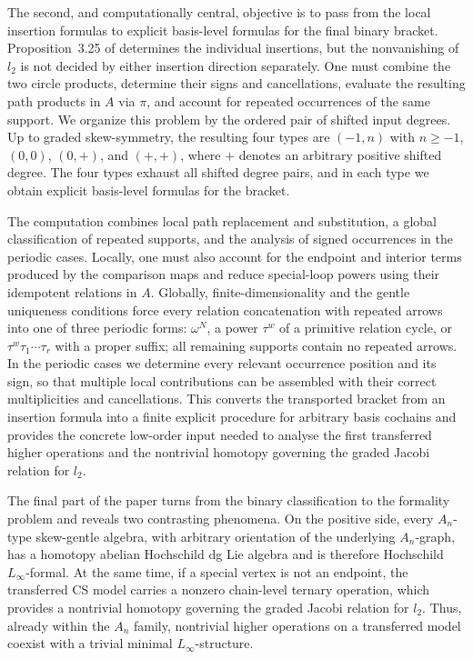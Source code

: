\documentclass[11pt,a4paper,reqno]{amsart}
\theoremstyle{plain}
\theoremstyle{definition}
\numberwithin{equation}{section}
\begin{document}
	The second, and computationally central, objective is to pass from the local
	insertion formulas to explicit basis-level formulas for the final binary
	bracket.  Proposition~3.25 of \cite{BSSWW26} determines the individual
	insertions, but the nonvanishing of $l_2$ is not decided by either insertion
	direction separately.  One must combine the two circle products, determine
	their signs and cancellations, evaluate the resulting path products in $A$
	via $\pi$, and account for repeated occurrences of the same support.  We
	organize this problem by the ordered pair of shifted input degrees.  Up to
	graded skew-symmetry, the resulting four types are $(-1,n)$ with $n\geq-1$,
	$(0,0)$, $(0,+)$, and $(+,+)$, where $+$ denotes an arbitrary positive
	shifted degree.  The four types exhaust all shifted degree pairs, and in each
	type we obtain explicit basis-level formulas for the bracket.
	
	The computation combines local path replacement and substitution, a global
	classification of repeated supports, and the analysis of signed occurrences
	in the periodic cases.  Locally, one must also account for the endpoint and
	interior terms produced by the comparison maps and reduce special-loop powers
	using their idempotent relations in $A$.  Globally, finite-dimensionality and
	the gentle uniqueness conditions force every relation concatenation with
	repeated arrows into one of three periodic forms: $\omega^N$, a power
	$\tau^w$ of a primitive relation cycle, or $\tau^w\tau_1\cdots\tau_r$ with a
	proper suffix; all remaining supports contain no repeated arrows.  In the
	periodic cases we determine every relevant occurrence position and its sign,
	so that multiple local contributions can be assembled with their correct
	multiplicities and cancellations.  This converts the transported bracket from an insertion formula into a finite explicit procedure for arbitrary basis	cochains and provides the concrete low-order input needed to analyse the first transferred higher operations and the nontrivial homotopy governing the graded Jacobi relation for $l_2$.
	
	The final part of the paper turns from the binary classification to the
	formality problem and reveals two contrasting phenomena. On the positive
	side, every $A_n$-type skew-gentle algebra, with arbitrary orientation of the underlying $A_n$-graph, has a homotopy abelian Hochschild dg Lie algebra and is therefore Hochschild $L_\infty$-formal.
	At the same time, if a special vertex is not an endpoint, the transferred CS model carries a nonzero chain-level ternary operation, which provides a nontrivial homotopy governing the graded Jacobi relation for $l_2$.	Thus, already within the $A_n$ family, nontrivial higher operations on a transferred model coexist with a trivial minimal	$L_\infty$-structure.
	
\end{document}
